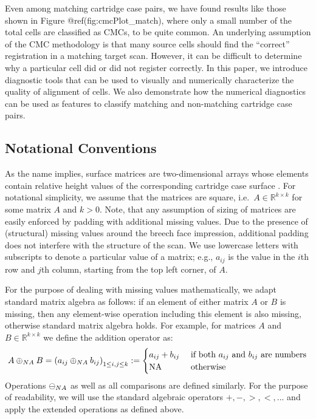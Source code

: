 \documentclass[11pt,]{isuthesis}
\begin{document}
Even among matching cartridge case pairs, we have found results like those shown in Figure @ref(fig:cmcPlot\_match), where only a small number of the total cells are classified as CMCs, to be quite common.
An underlying assumption of the CMC methodology is that many source cells should find the ``correct'' registration in a matching target scan.
However, it can be difficult to determine why a particular cell did or did not register correctly.
In this paper, we introduce diagnostic tools that can be used to visually and numerically characterize the quality of alignment of cells.
We also demonstrate how the numerical diagnostics can be used as features to classify matching and non-matching cartridge case pairs.

\hypertarget{notational-conventions}{%
\subsection{Notational Conventions}\label{notational-conventions}}

As the name implies, surface matrices are two-dimensional arrays whose elements contain relative height values of the corresponding cartridge case surface \citep{ISO25178-72}.
For notational simplicity, we assume that the matrices are square, i.e.~\(A \in \mathbb{R}^{k \times k}\) for some matrix \(A\) and \(k > 0\).
Note, that any assumption of sizing of matrices are easily enforced by padding with additional missing values. Due to the presence of (structural) missing values around the breech face impression, additional padding does not interfere with the structure of the scan.
We use lowercase letters with subscripts to denote a particular value of a matrix; e.g., \(a_{ij}\) is the value in the \(i\)th row and \(j\)th column, starting from the top left corner, of \(A\).

For the purpose of dealing with missing values mathematically, we adapt standard matrix algebra as follows: if an element of either matrix \(A\) or \(B\) is missing, then any element-wise operation including this element is also missing, otherwise standard matrix algebra holds.
For example, for matrices \(A\) and \(B \in \mathbb{R}^{k \times k}\) we define the addition operator as:
\[
A \oplus_{\tiny{NA}} B = \left( a_{ij} \oplus_{\tiny{NA}} b_{ij} \right)_{1 \le i,j \le k} :=
\begin{cases}
a_{ij} + b_{ij} & \text{ if both } a_{ij} \text{ and } b_{ij} \text{ are numbers}\\
\text{NA } & \text{ otherwise}
\end{cases}
\]
Operations \(\ominus_{\tiny{NA}}\) as well as all comparisons are defined similarly. For the purpose of readability, we will use the standard algebraic operators \(+, -, >, <, ...\) and apply the extended operations as defined above.
\end{document}
